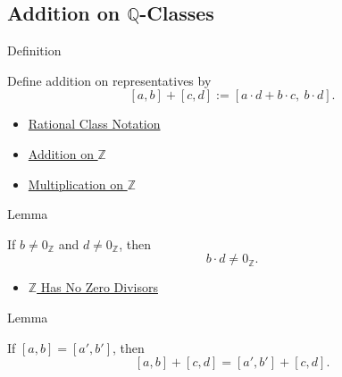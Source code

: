 \subsection*{\texorpdfstring{Addition on $\mathbb{Q}$-Classes}{Addition on Q-Classes}}

\begin{definitionbox}{Definition}
\begin{definition}
\label{def:addition-on-q-classes}
Define addition on representatives by
\[
[a,b]+[c,d]:=[a\cdot d+b\cdot c,\ b\cdot d].
\]
\end{definition}
\end{definitionbox}

\begin{dependencies}
\begin{itemize}
  \item \hyperref[def:rational-class-notation]{Rational Class Notation}
  \item \hyperref[def:addition-on-z-classes]{Addition on $\mathbb{Z}$}
  \item \hyperref[def:multiplication-on-z-classes]{Multiplication on $\mathbb{Z}$}
\end{itemize}
\end{dependencies}

\begin{lemmabox}{Lemma}
\begin{lemma}
\label{lem:addition-denominator-nonzero-q}
If $b\ne 0_{\mathbb{Z}}$ and $d\ne 0_{\mathbb{Z}}$, then
\[
b\cdot d\ne 0_{\mathbb{Z}}.
\]
\end{lemma}
\end{lemmabox}

\begin{dependencies}
\begin{itemize}
  \item \hyperref[thm:z-has-no-zero-divisors]{$\mathbb{Z}$ Has No Zero Divisors}
\end{itemize}
\end{dependencies}

\begin{lemmabox}{Lemma}
\begin{lemma}
\label{lem:addition-on-q-respects-left-equivalence}
If $[a,b]=[a',b']$, then
\[
[a,b]+[c,d]=[a',b']+[c,d].
\]
\end{lemma}
\end{lemmabox}


